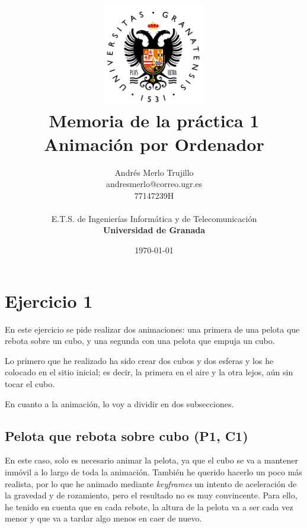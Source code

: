 \documentclass{article}
\title{
\includegraphics[width=1.75in]{imagenes/UGR-Logo.png} \\
\vspace*{1in}
\textbf{Memoria de la práctica 1} \\
Animación por Ordenador \\
\vspace*{0.5in}}
\author{Andrés Merlo Trujillo \\
andresmerlo@correo.ugr.es \\
77147239H \\ 
\vspace*{0.5in} \\
E.T.S. de Ingenierías Informática y de Telecomunicación \\
\textbf{Universidad de Granada}} \date{\today}
\begin{document}
\begin{titlingpage}
\maketitle
\end{titlingpage}

\tableofcontents

\newpage

\pagestyle{fancy}   %

\section{Ejercicio 1}

En este ejercicio se pide realizar dos animaciones: una primera de una pelota que rebota sobre un cubo, y una segunda con una pelota que empuja un cubo.

\bigskip


Lo primero que he realizado ha sido crear dos cubos y dos esferas y los he colocado en el sitio inicial; es decir, la primera en el aire y la otra lejos, aún sin tocar el cubo.


En cuanto a la animación, lo voy a dividir en dos subsecciones.

\subsection{Pelota que rebota sobre cubo (P1, C1)}

En este caso, solo es necesario animar la pelota, ya que el cubo se va a mantener inmóvil a lo largo de toda la animación. También he querido hacerlo un poco más realista, por lo que he animado mediante \textit{keyframes} un intento de aceleración de la gravedad y de rozamiento, pero el resultado no es muy convincente. Para ello, he tenido en cuenta que en cada rebote, la altura de la pelota va a ser cada vez menor y que va a tardar algo menos en caer de nuevo. 
\end{document}
